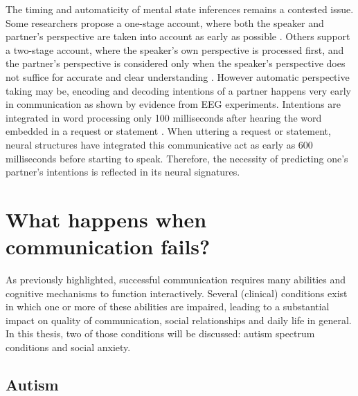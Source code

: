 The timing and automaticity of mental state inferences remains a contested issue. Some researchers propose a one-stage account, where both the speaker and partner's perspective are taken into account as early as possible \citep{brennan2009}. Others support a two-stage account, where the speaker's own perspective is processed first, and the partner's perspective is considered only when the speaker's perspective does not suffice for accurate and clear understanding \citep{barr2002}. However automatic perspective taking may be, encoding and decoding intentions of a partner happens very early in communication as shown by evidence from EEG experiments. Intentions are integrated in word processing only 100 milliseconds after hearing the word embedded in a request or statement \citep{tomasello2022}. When uttering a request or statement, neural structures have integrated this communicative act as early as 600 milliseconds before starting to speak. Therefore, the necessity of predicting one's partner's intentions is reflected in its neural signatures.

\section*{What happens when communication fails?}

As previously highlighted, successful communication requires many abilities and cognitive mechanisms to function interactively. Several (clinical) conditions exist in which one or more of these abilities are impaired, leading to a substantial impact on quality of communication, social relationships and daily life in general. In this thesis, two of those conditions will be discussed: autism spectrum conditions and social anxiety. 

\subsection*{Autism}

